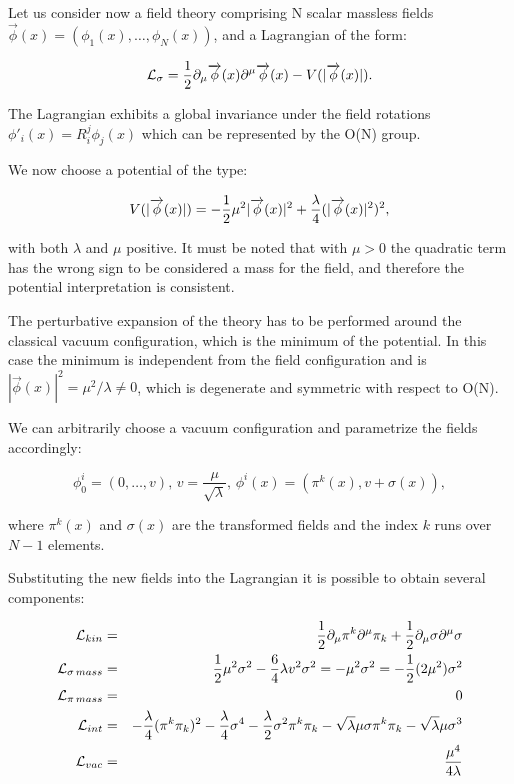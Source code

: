 Let us consider now a field theory comprising N scalar massless fields \\
$\vec{\phi}(x) = (\phi_1(x),\ldots,\phi_N(x))$, and a Lagrangian of the form:

\begin{equation}
\mathcal{L}_\sigma = \dfrac{1}{2} \partial_\mu \overrightarrow{\phi}(x) \partial^\mu \overrightarrow{\phi}(x) - V(|\overrightarrow{\phi}(x)|).
\label{eq:lin_sigma}
\end{equation}

The Lagrangian exhibits a global invariance under the field rotations $\phi'_i(x) = R_i^j \phi_j(x)$ which can be represented by the O(N) group. 

We now choose a potential of the type:

\begin{equation}
V(|\overrightarrow{\phi}(x)|) = - \dfrac{1}{2} \mu^2 |\overrightarrow{\phi}(x)|^2 + \dfrac{\lambda}{4} (|\overrightarrow{\phi}(x)|^2)^2,
\label{eq:lin_sigma}
\end{equation} 

with both $\lambda$ and $\mu$ positive. It must be noted that with $\mu > 0$ the quadratic term has the wrong sign to be considered a mass for the field, and therefore the potential interpretation is consistent.

The perturbative expansion of the theory has to be performed around the classical vacuum configuration, which is the minimum of the potential. In this case the minimum is independent from the field configuration and is $|\vec{\phi}(x)|^2 = \mu^2 / \lambda \neq 0$, which is degenerate and symmetric with respect to O(N).

We can arbitrarily choose a vacuum configuration and parametrize the fields accordingly:

\begin{equation}
\phi_0^i = (0, \ldots, v), \, v= \dfrac{\mu}{\sqrt{\lambda}}, \, \phi^i(x) = (\pi^k(x), v + \sigma(x)),
\end{equation}

where $\pi^k(x)$ and $\sigma(x)$ are the transformed fields and the index $k$ runs over $N-1$ elements. 

Substituting the new fields into the Lagrangian it is possible to obtain several components:

\begin{eqnarray}
\mathcal{L}_{kin} &=& \dfrac{1}{2} \partial_\mu \pi^k \partial^\mu \pi_k + \dfrac{1}{2}  \partial_\mu \sigma \partial^\mu \sigma \nonumber \\
\mathcal{L}_{\sigma \, mass} &=& \dfrac{1}{2} \mu^2 \sigma^2 - \dfrac{6}{4} \lambda v^2 \sigma^2 = - \mu^2 \sigma^2 = -\dfrac{1}{2} (2\mu^2) \sigma^2 \nonumber \\
\mathcal{L}_{\pi \, mass} &=& 0 \nonumber \\
\mathcal{L}_{int} &=& - \dfrac{\lambda}{4} (\pi^k\pi_k)^2 - \dfrac{\lambda}{4} \sigma^4 - \dfrac{\lambda}{2} \sigma^2 \pi^k \pi_k - \sqrt{\lambda} \mu \sigma \pi^k \pi_k - \sqrt{\lambda} \mu \sigma^3 \nonumber \\
\mathcal{L}_{vac} &=& \dfrac{\mu^4}{4\lambda} 
\end{eqnarray}

